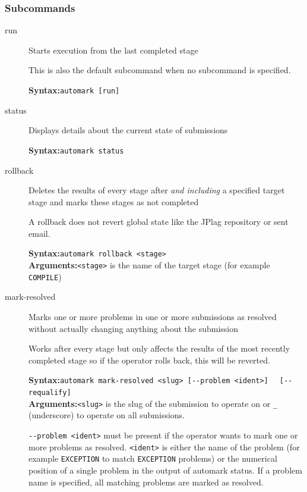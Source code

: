 \documentclass[12pt,a4paper,oneside]{report}
\begin{document}
	\subsubsection{Subcommands}
	\begin{description}
		\item[run] Starts execution from the last completed stage

		This is also the default subcommand when no subcommand is specified.

		\textbf{Syntax:}\tabto{75pt}\lstinline|automark [run]|

		\pagebreak
		\item[status] Displays details about the current state of submissions

		\textbf{Syntax:}\tabto{75pt}\lstinline|automark status|

		\item[rollback] Deletes the results of every stage after \emph{and including} a specified target stage and marks these stages as not completed

		A rollback does not revert global state like the JPlag repository or sent email.

		\textbf{Syntax:}\tabto{75pt}\lstinline|automark rollback <stage>|\\
		\textbf{Arguments:}\tabto{75pt}\lstinline|<stage>| is the name of the target stage (for example \lstinline|COMPILE|)
		\item[mark-resolved] Marks one or more problems in one or more submissions as resolved without actually changing anything about the submission

		Works after every stage but only affects the results of the most recently completed stage so if the operator rolls back, this will be reverted.

		\textbf{Syntax:}\tabto{75pt}\lstinline|automark mark-resolved <slug> [--problem <ident>]|
		\tabto{75pt}\lstinline|  [--requalify]|\\
		\textbf{Arguments:}\tabto{75pt}\lstinline|<slug>| is the slug of the submission to operate on or \lstinline|_| (underscore) to operate on all submissions.

		\lstinline|--problem <ident>| must be present if the operator wants to mark one or more problems as resolved. \lstinline|<ident>| is either the name of the problem (for example \lstinline|EXCEPTION| to match \lstinline|EXCEPTION| problems) or the numerical position of a single problem in the output of automark status. If a problem name is specified, all matching problems are marked as resolved.


\end{description}
\end{document}
